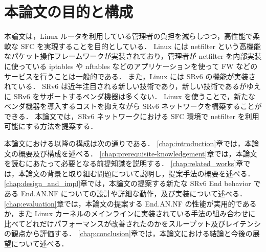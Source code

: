 \section{本論文の目的と構成}
本論文は，Linux ルータを利用している管理者の負担を減らしつつ，高性能で柔軟な SFC を実現することを目的としている．
Linux には netfilter という高機能なパケット操作フレームワークが実装されており，管理者が netfilter を内部実装に使っている iptables や nftables などのアプリケーションを使って FW などのサービスを行うことは一般的である．
また，Linux には SRv6 の機能が実装されている．
SRv6 は近年注目される新しい技術であり，新しい技術であるがゆえに SRv6 をサポートするベンダ機器は多くない．
Linux を使うことで，新たなベンダ機器を導入するコストを抑えながら SRv6 ネットワークを構築することができる．
本論文では，SRv6 ネットワークにおける SFC 環境で netfilter を利用可能にする方法を提案する．

本論文における以降の構成は次の通りである．
\ref*{chap:introduction}章では，本論文の概要及び構成を述べる．
\ref*{chap:prerequisite-knowledgement}章では，本論文を読むにあたって必要となる前提知識を説明する．
\ref*{chap:related_works}章では，本論文の背景と取り組む問題について説明し，提案手法の概要を述べる．
\ref*{chap:design_and_impl}章では，本論文の提案する新たな SRv6 End behavior である End.AN.NF についての設計や詳細な動作，及び実装について述べる．
\ref*{chap:evaluation}章では，本論文の提案する End.AN.NF の性能が実用的であるか，また Linux カーネルのメインラインに実装されている手法の組み合わせに比べてどれだけパフォーマンスが改善されたのかをスループット及びレイテンシの観点から評価する．
\ref*{chap:conclusion}章では，本論文における結論と今後の展望について述べる．
